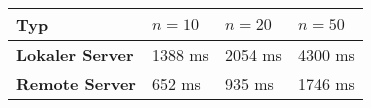 \begin{tabular}{l|lll}
\rowcolor{heading}
\color{white}\textbf{Typ} &
\color{white}\textbf{$n = 10$} &
\color{white}\textbf{$n = 20$} &
\color{white}\textbf{$n = 50$} \\
\hline
\cellcolor{editorGray}\textbf{Lokaler Server} & 1388 ms & 2054 ms
& 4300 ms\\
\cellcolor{editorGray}\textbf{Remote Server} & 652 ms & 935 ms &
1746 ms\\
\hline
\end{tabular}
